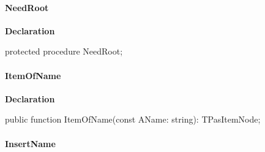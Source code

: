 \documentclass{report}
\newif\ifpdf
\begin{document}
\paragraph*{NeedRoot}\hspace*{\fill}

\label{PasDoc_HierarchyTree.TStringCardinalTree-NeedRoot}
\begin{list}{}{
\setlength{\itemindent}{0cm}
\setlength{\listparindent}{0cm}
\setlength{\leftmargin}{\evensidemargin}
\addtolength{\leftmargin}{\tmplength}
\settowidth{\labelsep}{X}
\addtolength{\leftmargin}{\labelsep}
\setlength{\labelwidth}{\tmplength}
}
\item[\textbf{Declaration}\hfill]
\ifpdf
\begin{flushleft}
\fi
\begin{ttfamily}
protected procedure NeedRoot;\end{ttfamily}

\ifpdf
\end{flushleft}
\fi

\end{list}
\paragraph*{ItemOfName}\hspace*{\fill}

\label{PasDoc_HierarchyTree.TStringCardinalTree-ItemOfName}
\begin{list}{}{
\setlength{\itemindent}{0cm}
\setlength{\listparindent}{0cm}
\setlength{\leftmargin}{\evensidemargin}
\addtolength{\leftmargin}{\tmplength}
\settowidth{\labelsep}{X}
\addtolength{\leftmargin}{\labelsep}
\setlength{\labelwidth}{\tmplength}
}
\item[\textbf{Declaration}\hfill]
\ifpdf
\begin{flushleft}
\fi
\begin{ttfamily}
public function ItemOfName(const AName: string): TPasItemNode;\end{ttfamily}

\ifpdf
\end{flushleft}
\fi

\end{list}
\paragraph*{InsertName}\hspace*{\fill}
\end{document}
